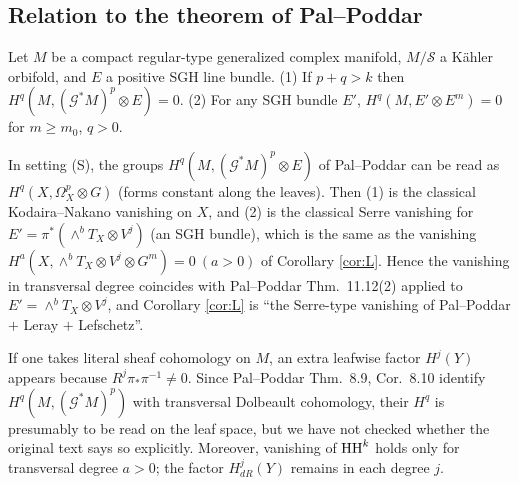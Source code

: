 \subsection{Relation to the theorem of Pal--Poddar}\label{subsec:PPcompare}
\begin{thm}\tC
Let $M$ be a compact regular-type generalized complex manifold, $M/\mathcal S$ a K\"ahler orbifold, and $E$ a positive SGH line bundle. (1) If $p+q>k$ then $H^q(M,(\mathcal G^*M)^p\otimes E)=0$. (2) For any SGH bundle $E'$, $H^q(M,E'\otimes E^m)=0$ for $m\ge m_0$, $q>0$.
\end{thm}
\begin{prop}\tP \tQ\label{prop:PPcompare}
In setting (S), the groups $H^q(M,(\mathcal G^*M)^p\otimes E)$ of Pal--Poddar can be read as $H^q(X,\Omega^p_X\otimes G)$ (forms constant along the leaves). Then (1) is the classical Kodaira--Nakano vanishing on $X$, and (2) is the classical Serre vanishing for $E'=\pi^*(\wedge^bT_X\otimes V^j)$ (an SGH bundle), which is the same as the vanishing $H^a(X,\wedge^bT_X\otimes V^j\otimes G^m)=0\ (a>0)$ of Corollary \ref{cor:L}. Hence the vanishing in transversal degree coincides with Pal--Poddar Thm.\ 11.12(2) applied to $E'=\wedge^bT_X\otimes V^j$, and Corollary \ref{cor:L} is ``the Serre-type vanishing of Pal--Poddar $+$ Leray $+$ Lefschetz''.
\end{prop}
\begin{rem}[\tQ]
If one takes literal sheaf cohomology on $M$, an extra leafwise factor $H^j(Y)$ appears because $R^j\pi_*\pi^{-1}\ne0$. Since Pal--Poddar Thm.\ 8.9, Cor.\ 8.10 identify $H^q(M,(\mathcal G^*M)^p)$ with transversal Dolbeault cohomology, their $H^q$ is presumably to be read on the leaf space, but we have not checked whether the original text says so explicitly. Moreover, vanishing of $\mathrm{HH}^k$ holds only for transversal degree $a>0$; the factor $H^j_{dR}(Y)$ remains in each degree $j$.
\end{rem}

